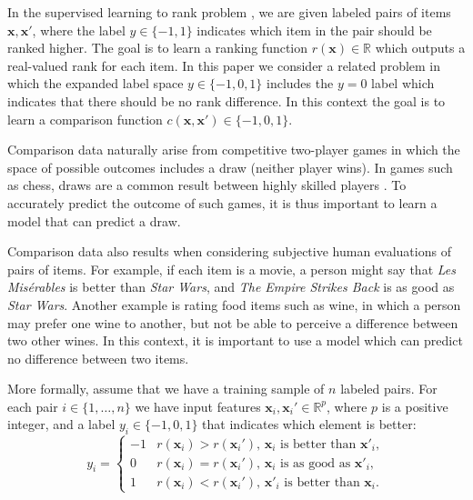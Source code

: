 \documentclass[twoside,11pt]{article}
\newcommand{\RR}{\mathbb R}
\begin{document}
In the supervised learning to rank problem \citep{learning-to-rank}, we are
given labeled pairs of items $\mathbf x,\mathbf x'$, where the label
$y\in\{-1,1\}$ indicates which item in the pair should be ranked
higher. The goal is to learn a ranking function $r(\mathbf x)\in\RR$
which outputs a real-valued rank for each item. In this paper we
consider a related problem in which the expanded label space
$y\in\{-1,0,1\}$ includes the $y=0$ label which indicates that there
should be no rank difference. In this context the goal is to learn a
comparison function $c(\mathbf x, \mathbf x')\in\{-1,0,1\}$.

Comparison data naturally arise from competitive two-player games in which
the space of possible outcomes includes a draw (neither player wins).
In games such as chess, draws are a common result between highly
skilled players \citep{elo_score}. To accurately predict the outcome of such games, it
is thus important to learn a model that can predict a draw. 

Comparison data also results when considering subjective human
evaluations of pairs of items. For example, if each item is a movie, a
person might say that \textit{Les Mis\'erables} is better than
\textit{Star Wars}, and \textit{The Empire Strikes Back} is as good as
\textit{Star Wars}. Another example is rating food items such as
wine, in which a person may prefer one wine to another, but not be
able to perceive a difference between two other wines. In this
context, it is important to use a model which can predict no
difference between two items.

More formally, assume
that we have a training sample of $n$ labeled pairs. For each pair
$i\in\{1,\dots,n\}$ we have input features $\mathbf x_i,\mathbf
x_i'\in\RR^p$, where $p$ is a positive integer, and a label $y_i\in\{-1,0,1\}$ that indicates which
element is better:
\begin{equation}
  \label{eq:z}
  y_i =
  \begin{cases}
    -1 &  r(\mathbf x_i)>r(\mathbf x_i')
    \text{, $\mathbf x_i$ is better than $\mathbf x'_i$},\\
    0 & r(\mathbf x_i) = r(\mathbf x_i')
    \text{, $\mathbf x_i$ is as good as $\mathbf x'_i$},\\
    1 & r(\mathbf x_i)<r(\mathbf x_i')
    \text{, $\mathbf x'_i$ is better than $\mathbf x_i$}.
  \end{cases}
\end{equation}
\end{document}

